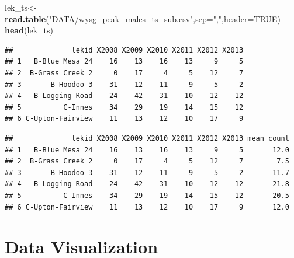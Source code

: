 \documentclass[
]{book}
\newenvironment{Shaded}{\begin{snugshade}}{\end{snugshade}}
\newcommand{\AttributeTok}[1]{\textcolor[rgb]{0.13,0.29,0.53}{#1}}
\newcommand{\CommentTok}[1]{\textcolor[rgb]{0.56,0.35,0.01}{\textit{#1}}}
\newcommand{\ConstantTok}[1]{\textcolor[rgb]{0.56,0.35,0.01}{#1}}
\newcommand{\DecValTok}[1]{\textcolor[rgb]{0.00,0.00,0.81}{#1}}
\newcommand{\FunctionTok}[1]{\textcolor[rgb]{0.13,0.29,0.53}{\textbf{#1}}}
\newcommand{\NormalTok}[1]{#1}
\newcommand{\OtherTok}[1]{\textcolor[rgb]{0.56,0.35,0.01}{#1}}
\newcommand{\SpecialCharTok}[1]{\textcolor[rgb]{0.81,0.36,0.00}{\textbf{#1}}}
\newcommand{\StringTok}[1]{\textcolor[rgb]{0.31,0.60,0.02}{#1}}
\begin{document}
\begin{Shaded}
\begin{Highlighting}[]
\NormalTok{lek\_ts}\OtherTok{\textless{}{-}}\FunctionTok{read.table}\NormalTok{(}\StringTok{"DATA/wysg\_peak\_males\_ts\_sub.csv"}\NormalTok{,}\AttributeTok{sep=}\StringTok{","}\NormalTok{,}\AttributeTok{header=}\ConstantTok{TRUE}\NormalTok{)}
\FunctionTok{head}\NormalTok{(lek\_ts)}
\end{Highlighting}
\end{Shaded}

\begin{verbatim}
##              lekid X2008 X2009 X2010 X2011 X2012 X2013
## 1   B-Blue Mesa 24    16    13    16    13     9     5
## 2  B-Grass Creek 2     0    17     4     5    12     7
## 3       B-Hoodoo 3    31    12    11     9     5     2
## 4   B-Logging Road    24    42    31    10    12    12
## 5          C-Innes    34    29    19    14    15    12
## 6 C-Upton-Fairview    11    13    12    10    17     9
\end{verbatim}

\begin{Shaded}
\end{Shaded}

\begin{verbatim}
##              lekid X2008 X2009 X2010 X2011 X2012 X2013 mean_count
## 1   B-Blue Mesa 24    16    13    16    13     9     5       12.0
## 2  B-Grass Creek 2     0    17     4     5    12     7        7.5
## 3       B-Hoodoo 3    31    12    11     9     5     2       11.7
## 4   B-Logging Road    24    42    31    10    12    12       21.8
## 5          C-Innes    34    29    19    14    15    12       20.5
## 6 C-Upton-Fairview    11    13    12    10    17     9       12.0
\end{verbatim}

\hypertarget{data-visualization}{%
\chapter{Data Visualization}\label{data-visualization}}
\end{document}
